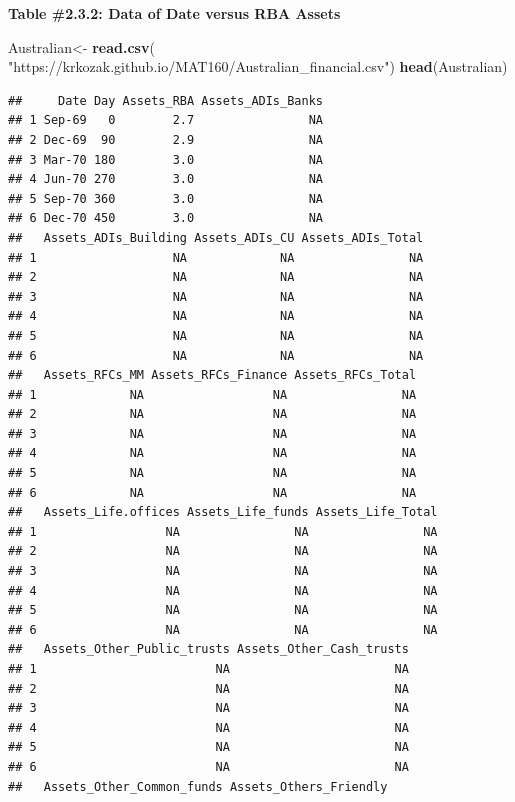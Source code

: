 \documentclass[
]{book}
\newenvironment{Shaded}{\begin{snugshade}}{\end{snugshade}}
\newcommand{\KeywordTok}[1]{\textcolor[rgb]{0.13,0.29,0.53}{\textbf{#1}}}
\newcommand{\NormalTok}[1]{#1}
\newcommand{\StringTok}[1]{\textcolor[rgb]{0.31,0.60,0.02}{#1}}
\begin{document}
\textbf{Table \#2.3.2: Data of Date versus RBA Assets}

\begin{Shaded}
\begin{Highlighting}[]
\NormalTok{Australian<-}\StringTok{ }\KeywordTok{read.csv}\NormalTok{(}
  \StringTok{"https://krkozak.github.io/MAT160/Australian_financial.csv"}\NormalTok{)}
\KeywordTok{head}\NormalTok{(Australian)}
\end{Highlighting}
\end{Shaded}

\begin{verbatim}
##     Date Day Assets_RBA Assets_ADIs_Banks
## 1 Sep-69   0        2.7                NA
## 2 Dec-69  90        2.9                NA
## 3 Mar-70 180        3.0                NA
## 4 Jun-70 270        3.0                NA
## 5 Sep-70 360        3.0                NA
## 6 Dec-70 450        3.0                NA
##   Assets_ADIs_Building Assets_ADIs_CU Assets_ADIs_Total
## 1                   NA             NA                NA
## 2                   NA             NA                NA
## 3                   NA             NA                NA
## 4                   NA             NA                NA
## 5                   NA             NA                NA
## 6                   NA             NA                NA
##   Assets_RFCs_MM Assets_RFCs_Finance Assets_RFCs_Total
## 1             NA                  NA                NA
## 2             NA                  NA                NA
## 3             NA                  NA                NA
## 4             NA                  NA                NA
## 5             NA                  NA                NA
## 6             NA                  NA                NA
##   Assets_Life.offices Assets_Life_funds Assets_Life_Total
## 1                  NA                NA                NA
## 2                  NA                NA                NA
## 3                  NA                NA                NA
## 4                  NA                NA                NA
## 5                  NA                NA                NA
## 6                  NA                NA                NA
##   Assets_Other_Public_trusts Assets_Other_Cash_trusts
## 1                         NA                       NA
## 2                         NA                       NA
## 3                         NA                       NA
## 4                         NA                       NA
## 5                         NA                       NA
## 6                         NA                       NA
##   Assets_Other_Common_funds Assets_Others_Friendly

\end{verbatim}
\end{document}
